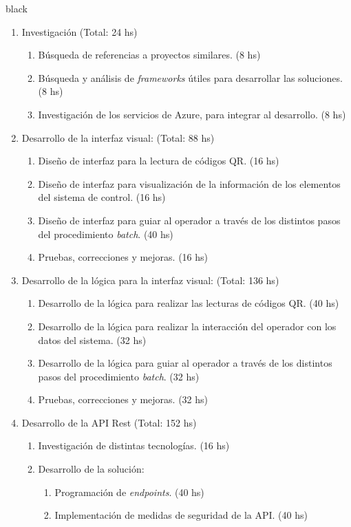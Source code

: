 \documentclass[11pt]{charter}
\begin{document}
\begin{consigna}{black}
\begin{enumerate}
\item Investigación (Total: 24 hs)
	\begin{enumerate}
	\item Búsqueda de referencias a proyectos similares. (8 hs)
	\item Búsqueda y análisis de \textit{frameworks} útiles para desarrollar las soluciones.  (8 hs)
	\item Investigación de los servicios de Azure, para integrar al desarrollo. (8 hs)
	\end{enumerate}
\item Desarrollo de la interfaz visual: (Total: 88 hs)
	\begin{enumerate}
	\item Diseño de interfaz para la lectura de códigos QR. (16 hs)
	\item Diseño de interfaz para visualización de la información de los elementos del sistema de control. (16 hs)
	\item Diseño de interfaz para guiar al operador a través de los distintos pasos del procedimiento \textit{batch}. (40 hs)
	\item Pruebas, correcciones y mejoras. (16 hs)
	\end{enumerate}
\item Desarrollo de la lógica para la interfaz visual: (Total: 136 hs)
	\begin{enumerate}
	\item Desarrollo de la lógica para realizar las lecturas de códigos QR. (40 hs)
	\item Desarrollo de la lógica para realizar la interacción del operador con los datos del sistema. (32 hs)
	\item Desarrollo de la lógica para guiar al operador a través de los distintos pasos del procedimiento \textit{batch}. (32 hs)
	\item Pruebas, correcciones y mejoras. (32 hs)
	\end{enumerate}
\item Desarrollo de la API Rest (Total: 152 hs)
	\begin{enumerate}
	\item Investigación de distintas tecnologías. (16 hs)
	\item Desarrollo de la solución:
		\begin{enumerate}
			\item Programación de \textit{endpoints}. (40 hs)
			\item Implementación de medidas de seguridad de la API. (40 hs)

\end{enumerate}
\end{enumerate}
\end{enumerate}
\end{consigna}
\end{document}

